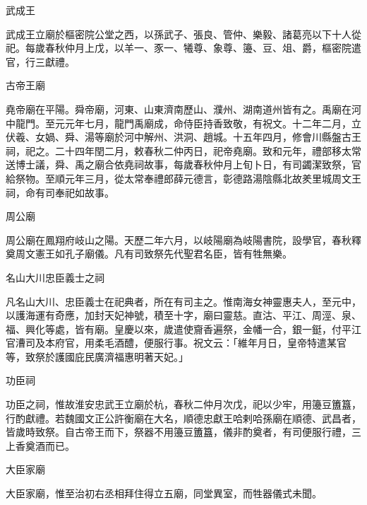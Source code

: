 \begin{pinyinscope}
 武成王



 武成王立廟於樞密院公堂之西，以孫武子、張良、管仲、樂毅、諸葛亮以下十人從祀。每歲春秋仲月上戊，以羊一、豕一、犧尊、象尊、籩、豆、俎、爵，樞密院遣官，行三獻禮。



 古帝王廟



 堯帝廟在平陽。舜帝廟，河東、山東濟南歷山、濮州、湖南道州皆有之。禹廟在河中龍門。至元元年七月，龍門禹廟成，命侍臣持香致敬，有祝文。十二年二月，立伏羲、女媧、舜、湯等廟於河中解州、洪洞、趙城。十五年四月，修會川縣盤古王祠，祀之。二十四年閏二月，敕春秋二仲丙日，祀帝堯廟。致和元年，禮部移太常送博士議，舜、禹之廟合依堯祠故事，每歲春秋仲月上旬卜日，有司蠲潔致祭，官給祭物。至順元年三月，從太常奉禮郎薛元德言，彰德路湯陰縣北故羑里城周文王祠，命有司奉祀如故事。



 周公廟



 周公廟在鳳翔府岐山之陽。天歷二年六月，以岐陽廟為岐陽書院，設學官，春秋釋奠周文憲王如孔子廟儀。凡有司致祭先代聖君名臣，皆有牲無樂。



 名山大川忠臣義士之祠



 凡名山大川、忠臣義士在祀典者，所在有司主之。惟南海女神靈惠夫人，至元中，以護海運有奇應，加封天妃神號，積至十字，廟曰靈慈。直沽、平江、周涇、泉、福、興化等處，皆有廟。皇慶以來，歲遣使齎香遍祭，金幡一合，銀一鋌，付平江官漕司及本府官，用柔毛酒醴，便服行事。祝文云：「維年月日，皇帝特遣某官等，致祭於護國庇民廣濟福惠明著天妃。」



 功臣祠



 功臣之祠，惟故淮安忠武王立廟於杭，春秋二仲月次戊，祀以少牢，用籩豆簠簋，行酌獻禮。若魏國文正公許衡廟在大名，順德忠獻王哈剌哈孫廟在順德、武昌者，皆歲時致祭。自古帝王而下，祭器不用籩豆簠簋，儀非酌奠者，有司便服行禮，三上香奠酒而已。



 大臣家廟



 大臣家廟，惟至治初右丞相拜住得立五廟，同堂異室，而牲器儀式未聞。



\end{pinyinscope}